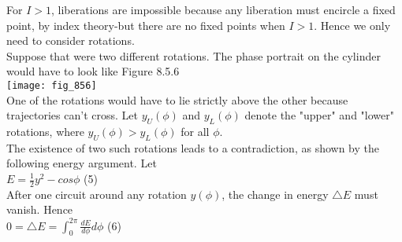 \documentclass{article}
\newcommand\tab[1][1cm]{\hspace*{#1}}
\begin{document}
For $I>1$, liberations are impossible because any liberation must encircle a fixed point, by index theory-but there are no fixed points when $I>1$. Hence we only need to consider rotations. \\ \tab
Suppose that were two different rotations. The phase portrait on the cylinder would have to look like Figure 8.5.6 \\ 
\texttt{[image: fig\_856]} \\
One of the rotations would have to lie strictly above the other because trajectories can't cross. Let $y_{U}(\phi)$ and $y_{L}(\phi)$ denote the "upper" and "lower" rotations, where $y_{U}(\phi)>y_{L}(\phi)$ for all $\phi$. \\ \tab
The existence of two such rotations leads to a contradiction, as shown by the following energy argument. Let \\ \tab \tab
$E=\frac{1}{2}y^{2}-cos\phi$ \tab (5) \\
After one circuit around any rotation $y(\phi)$, the change in energy $\triangle E$ must vanish. Hence \\ \tab \tab
$0=\triangle E = \int_{0}^{2\pi}\frac{dE}{d\phi} d\phi$ \tab (6) \\
\end{document}

